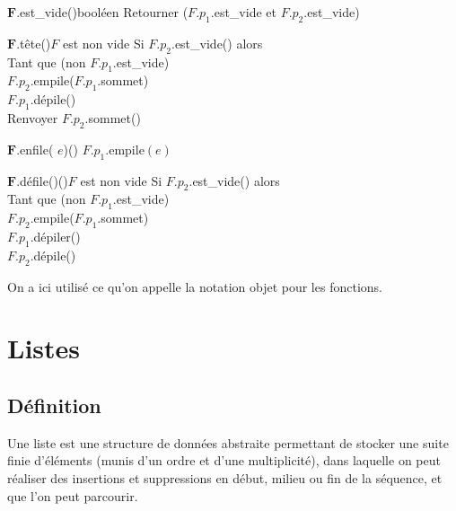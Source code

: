 		\begin{pscode}{\(\bm{F.}\)est\_vide}{()}{booléen}{}
			Retourner (\(F.p_1.\)\textsf{est\_vide} et \(F.p_2.\)\textsf{est\_vide})
		\end{pscode}
		
		\begin{pscode}{\(\bm{F.}\)tête}{()}{}{\(F\) est non vide}
			Si \(F.p_2.\)\textsf{est\_vide}() alors \\ \Indp
				Tant que (non \(F.p_1.\)\textsf{est\_vide}) \\ \Indp
					\(F.p_2.\)\textsf{empile}(\(F.p_1.\)\textsf{sommet}) \\
					\(F.p_1.\)\textsf{dépile}() \\ \Indm \Indm
			Renvoyer \(F.p_2.\)\textsf{sommet}()
		\end{pscode}
		
		\begin{pscode}{\(\bm{F.}\)\textsf{enfile}}{( \(e\))}{()}{}
			\(F.p_1.\)\textsf{empile}\((e)\)
		\end{pscode}
		
		\begin{pscode}{\(\bm{F.}\)\textsf{défile}}{()}{()}{\(F\) est non vide}
			Si \(F.p_2.\)\textsf{est\_vide}() alors \\ \Indp
				Tant que (non \(F.p_1.\)\textsf{est\_vide}) \\ \Indp
					\(F.p_2.\)\textsf{empile}(\(F.p_1.\)\textsf{sommet}) \\
					\(F.p_1.\)\textsf{dépiler}() \\ \Indm \Indm
			\(F.p_2.\)\textsf{dépile}()
		\end{pscode}
	
		\begin{Remarque}
			On a ici utilisé ce qu'on appelle la notation objet pour les fonctions.
		\end{Remarque}
	
\section{Listes}

	\subsection{Définition}
		
		\begin{Definition}[liste]
			Une liste est une structure de données abstraite permettant de stocker une suite finie d'éléments (munis d'un ordre et d'une multiplicité), dans laquelle on peut réaliser des insertions et suppressions en début, milieu ou fin de la séquence, et que l'on peut parcourir.
		\end{Definition}
		
